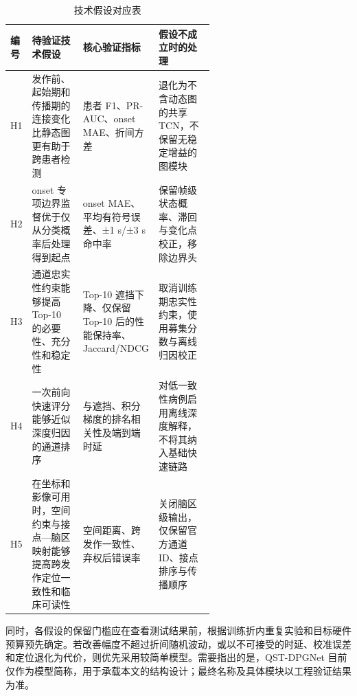 \documentclass{cumcmthesis_v2}
\numberwithin{figure}{section} %
\numberwithin{table}{section} %
\begin{document}
\begin{table}[htbp]
	\centering
	\caption{技术假设对应表}
    \label{tab:technical-hypotheses}
    \renewcommand{\arraystretch}{1.5}
    \setlength{\tabcolsep}{4pt}
    \begin{tabularx}{\linewidth}{@{}
        p{0.06\linewidth}
        p{0.25\linewidth}
        p{0.28\linewidth}
        X
    @{}}

		\toprule[1pt]
		\textbf{编号	} & \textbf{	待验证技术假设} & \textbf{核心验证指标} & \textbf{假设不成立时的处理}\\
		\midrule
		H1	&发作前、起始期和传播期的连接变化比静态图更有助于跨患者检测	&患者 F1、PR-AUC、onset MAE、折间方差	&退化为不含动态图的共享 TCN，不保留无稳定增益的图模块\\
		H2	&onset 专项边界监督优于仅从分类概率后处理得到起点	&onset MAE、平均有符号误差、±1 s/±3 s 命中率&保留帧级状态概率、滞回与变化点校正，移除边界头\\
        H3	&通道忠实性约束能够提高 Top-10 的必要性、充分性和稳定性	&Top-10 遮挡下降、仅保留 Top-10 后的性能保持率、Jaccard/NDCG	&	取消训练期忠实性约束，使用募集分数与离线归因校正\\
        H4	&一次前向快速评分能够近似深度归因的通道排序	&与遮挡、积分梯度的排名相关性及端到端时延&	对低一致性病例启用离线深度解释，不将其纳入基础快速链路\\
        H5	&在坐标和影像可用时，空间约束与接点—脑区映射能够提高跨发作定位一致性和临床可读性	&空间距离、跨发作一致性、弃权后错误率	&关闭脑区级输出，仅保留官方通道 ID、接点排序与传播顺序\\

		\bottomrule[1pt]
	\end{tabularx}
\end{table}
同时，各假设的保留门槛应在查看测试结果前，根据训练折内重复实验和目标硬件预算预先确定。若改善幅度不超过折间随机波动，或以不可接受的时延、校准误差和定位退化为代价，则优先采用较简单模型。需要指出的是，QST-DPGNet 目前仅作为模型简称，用于承载本文的结构设计；最终名称及具体模块以工程验证结果为准。




\end{document}
